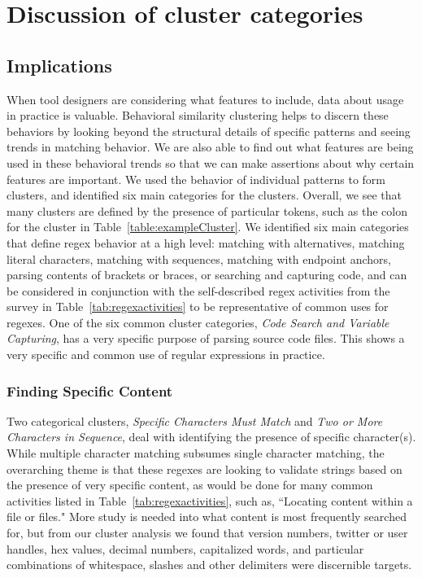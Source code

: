 \section{Discussion of cluster categories}
\subsection{Implications}
When tool designers are considering what features to include, data about usage in practice is valuable.  Behavioral similarity clustering  helps to discern these behaviors by looking beyond the structural details of specific patterns and seeing trends in  matching behavior. We are also able to find out what features are being used in these behavioral trends so that we can make assertions about why certain features are important.
We used the behavior of individual patterns to form clusters, and identified six main categories for the clusters.
 Overall, we see that many clusters are defined by the presence of particular tokens, such as the colon for the cluster in Table~\ref{table:exampleCluster}.
We identified six main categories that define regex behavior at a high level: matching with alternatives, matching literal characters, matching with sequences, matching with endpoint anchors, parsing contents of brackets or braces, or searching and capturing code, and can be considered in conjunction with the self-described regex activities from the survey in Table~\ref{tab:regexactivities} to be representative of common uses for regexes.
One of the six common cluster categories, \emph{Code Search and Variable Capturing}, has a very specific purpose of parsing source code files. This shows a very specific and common use of regular expressions in practice.

\subsubsection{Finding Specific Content}
Two categorical clusters, \emph{Specific Characters Must Match} and \emph{Two or More Characters in Sequence}, deal with identifying the presence of specific character(s).
While multiple character matching subsumes single character matching, the overarching theme is that these regexes are looking to validate strings based on the presence of very specific content, as would be done for many common activities listed in Table~\ref{tab:regexactivities}, such as, ``Locating content within a file or files."
More study is needed into what content is most frequently searched for, but from our cluster analysis we found that version numbers, twitter or user handles, hex values, decimal numbers, capitalized words, and particular combinations of whitespace, slashes and other delimiters were discernible targets.

